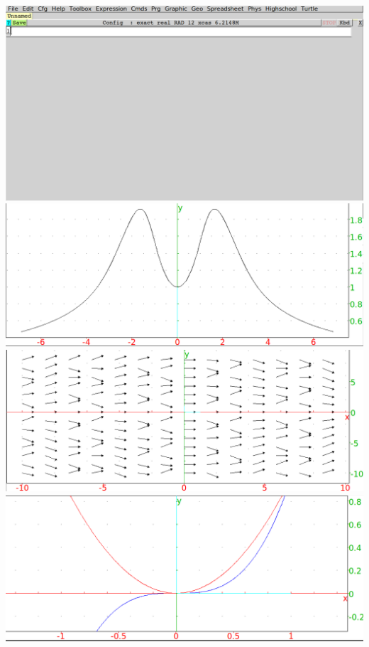 \documentclass{article}
\begin{document}
\clearpage%
\includegraphics[width=\textwidth]{./xcas-open.png}
\clearpage%
\includegraphics[width=\textwidth]{./xcas-plotode.png}
\clearpage%
\includegraphics[width=\textwidth]{./xcas-plotfield.png}
\clearpage%
\includegraphics[width=\textwidth]{./xcas-plot.png}
\clearpage%
\end{document}
